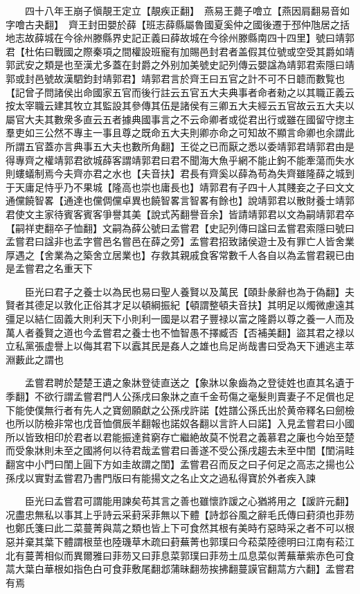 　　四十八年王崩子愼靚王定立【靚疾正翻】　燕易王薨子噲立【燕因肩翻易音如字噲古夬翻】　齊王封田嬰於薛【班志薛縣屬魯國夏奚仲之國後遷于邳仲虺居之括地志故薛城在今徐州滕縣界史記正義曰薛故城在今徐州滕縣南四十四里】號曰靖郭君【杜佑曰戰國之際秦項之間權設班寵有加賜邑封君者盖假其位號或空受其爵如靖郭武安之類是也至漢尤多蓋在封爵之外别加美號史記列傳云嬰諡為靖郭君索隱曰靖郭或封邑號故漢駟鈞封靖郭君】靖郭君言於齊王曰五官之計不可不日聼而數覧也【記曾子問諸侯出命國家五官而後行註云五官五大夫典事者命者勑之以其職正義云按太宰職云建其牧立其監設其參傳其伍是諸侯有三卿五大夫經云五官故云五大夫以屬官大夫其數衆多直云五者據典國事言之不云命卿者或從君出行或雖在國留守揔主羣吏如三公然不專主一事且尊之既命五大夫則卿亦命之可知故不顯言命卿也余謂此所謂五官蓋亦言典事五大夫也數所角翻】王從之已而厭之悉以委靖郭君靖郭君由是得專齊之權靖郭君欲城薛客謂靖郭君曰君不聞海大魚乎網不能止鉤不能牽蕩而失水則螻蟻制焉今夫齊亦君之水也【夫音扶】君長有齊奚以薛為苟為失齊雖隆薛之城到于天庸足恃乎乃不果城【隆高也崇也庸長也】靖郭君有子四十人其賤妾之子曰文文通儻饒智畧【通達也儻倜儻卓異也饒智畧言智畧有餘也】說靖郭君以散財養士靖郭君使文主家待賓客賓客爭譽其美【說式芮翻譽音余】皆請靖郭君以文為嗣靖郭君卒【嗣祥吏翻卒子恤翻】文嗣為薛公號曰孟嘗君【史記列傳曰諡曰孟嘗君索隱曰號曰孟嘗君曰諡非也孟字嘗邑名嘗邑在薛之旁】孟嘗君招致諸侯遊士及有罪亡人皆舍業厚遇之【舍業為之築舍立居業也】存救其親戚食客常數千人各自以為孟嘗君親已由是孟嘗君之名重天下

　　臣光曰君子之養士以為民也易曰聖人養賢以及萬民【頤卦彖辭也為于偽翻】夫賢者其德足以敦化正俗其才足以頓綱振紀【頓謂整頓夫音扶】其明足以燭微慮遠其彊足以結仁固義大則利天下小則利一國是以君子豐禄以富之隆爵以尊之養一人而及萬人者養賢之道也今孟嘗君之養士也不恤智愚不擇臧否【否補美翻】盜其君之禄以立私黨張虚譽上以侮其君下以蠧其民是姦人之雄也烏足尚哉書曰受為天下逋逃主萃淵藪此之謂也

　　孟嘗君聘於楚楚王遺之象牀登徒直送之【象牀以象齒為之登徒姓也直其名遺于季翻】不欲行謂孟嘗君門人公孫戌曰象牀之直千金苟傷之毫髮則賣妻子不足償也足下能使僕無行者有先人之寶劒願獻之公孫戌許諾【姓譜公孫氏出於黄帝釋名曰劒檢也所以防檢非常也戊音恤償辰羊翻報也諾奴各翻以言許人曰諾】入見孟嘗君曰小國所以皆致相印於君者以君能振達貧窮存亡繼絶故莫不悦君之義慕君之廉也今始至楚而受象牀則未至之國將何以待君哉孟嘗君曰善遂不受公孫戌趨去未至中閨【閨涓畦翻宮中小門曰閨上圓下方如圭故謂之閨】孟嘗君召而反之曰子何足之高志之揚也公孫戌以實對孟嘗君乃書門版曰有能揚文之名止文之過私得寶於外者疾入諫

　　臣光曰孟嘗君可謂能用諫矣苟其言之善也雖懷詐諼之心猶將用之【諼許元翻】况盡忠無私以事其上乎詩云采葑采菲無以下體【詩邶谷風之辭毛氏傳曰葑須也菲芴也鄭氏箋曰此二菜蔓菁與蒚之類也皆上下可食然其根有美時冇惡時采之者不可以根惡并棄其葉下體謂根莖也陸璣草木疏曰葑蕪菁也郭璞曰今菘菜陸德明曰江南有菘江北有蔓菁相似而異爾雅曰菲芴又曰菲息菜郭璞曰菲芴土瓜息菜似菁蕪華紫赤色可食蒚大葉白華根如指色白可食菲敷尾翻邶蒲昧翻芴挨拂翻蔓謨官翻蒚方六翻】孟嘗君有焉


